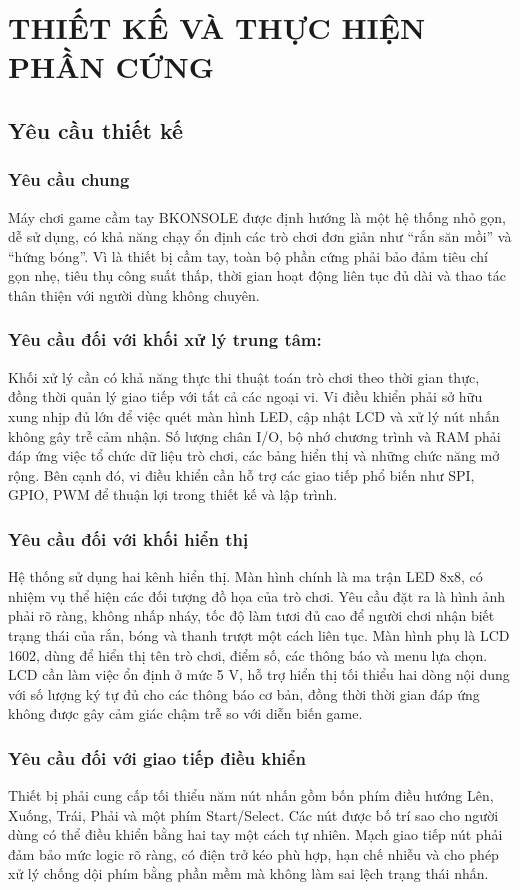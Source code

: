 \section{THIẾT KẾ VÀ THỰC HIỆN PHẦN CỨNG}
\subsection{Yêu cầu thiết kế}
\subsubsection{Yêu cầu chung}
Máy chơi game cầm tay BKONSOLE được định hướng là một hệ thống nhỏ gọn, dễ sử dụng, có khả năng chạy ổn định các trò chơi đơn giản như “rắn săn mồi” và “hứng bóng”. Vì là thiết bị cầm tay, toàn bộ phần cứng phải bảo đảm tiêu chí gọn nhẹ, tiêu thụ công suất thấp, thời gian hoạt động liên tục đủ dài và thao tác thân thiện với người dùng không chuyên.
\subsubsection{Yêu cầu đối với khối xử lý trung tâm:}
Khối xử lý cần có khả năng thực thi thuật toán trò chơi theo thời gian thực, đồng thời quản lý giao tiếp với tất cả các ngoại vi. Vi điều khiển phải sở hữu xung nhịp đủ lớn để việc quét màn hình LED, cập nhật LCD và xử lý nút nhấn không gây trễ cảm nhận. Số lượng chân I/O, bộ nhớ chương trình và RAM phải đáp ứng việc tổ chức dữ liệu trò chơi, các bảng hiển thị và những chức năng mở rộng. Bên cạnh đó, vi điều khiển cần hỗ trợ các giao tiếp phổ biến như SPI, GPIO, PWM để thuận lợi trong thiết kế và lập trình.
\subsubsection{Yêu cầu đối với khối hiển thị}
Hệ thống sử dụng hai kênh hiển thị. Màn hình chính là ma trận LED 8x8, có nhiệm vụ thể hiện các đối tượng đồ họa của trò chơi. Yêu cầu đặt ra là hình ảnh phải rõ ràng, không nhấp nháy, tốc độ làm tươi đủ cao để người chơi nhận biết trạng thái của rắn, bóng và thanh trượt một cách liên tục. Màn hình phụ là LCD 1602, dùng để hiển thị tên trò chơi, điểm số, các thông báo và menu lựa chọn. LCD cần làm việc ổn định ở mức 5 V, hỗ trợ hiển thị tối thiểu hai dòng nội dung với số lượng ký tự đủ cho các thông báo cơ bản, đồng thời thời gian đáp ứng không được gây cảm giác chậm trễ so với diễn biến game.
\subsubsection{Yêu cầu đối với giao tiếp điều khiển}
Thiết bị phải cung cấp tối thiểu năm nút nhấn gồm bốn phím điều hướng Lên, Xuống, Trái, Phải và một phím Start/Select. Các nút được bố trí sao cho người dùng có thể điều khiển bằng hai tay một cách tự nhiên. Mạch giao tiếp nút phải đảm bảo mức logic rõ ràng, có điện trở kéo phù hợp, hạn chế nhiễu và cho phép xử lý chống dội phím bằng phần mềm mà không làm sai lệch trạng thái nhấn.
